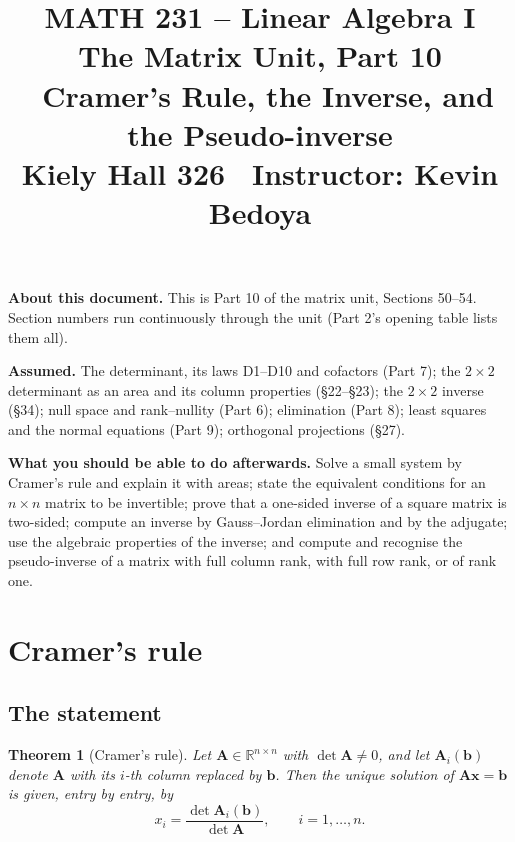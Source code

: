 \documentclass[11pt]{article}
\title{\vspace{-1.2cm}\textbf{\sffamily MATH 231 -- Linear Algebra I}\\[4pt]
       {\large\sffamily The Matrix Unit, Part 10 \textbullet\ Cramer's Rule,
        the Inverse, and the Pseudo-inverse}\\[2pt]
       {\normalsize\sffamily Kiely Hall 326 \textbullet\
        Instructor: Kevin Bedoya}}
\author{}
\date{}
\theoremstyle{plain}
\newtheorem{thm}{Theorem}[section]
\theoremstyle{definition}
\theoremstyle{remark}
\newcommand{\R}{\mathbb{R}}
\newcommand{\vc}[1]{\mathbf{#1}}
\newcommand{\mt}[1]{\mathbf{#1}}
\begin{document}
\setcounter{section}{49}  %
\maketitle
\vspace{-1.6cm}

\noindent\textbf{About this document.} This is Part 10 of the matrix unit,
Sections 50--54. Section numbers run continuously through the unit (Part 2's
opening table lists them all).

\medskip
\noindent\textbf{Assumed.} The determinant, its laws D1--D10 and cofactors
(Part 7); the $2\times2$ determinant as an area and its column properties
(\S22--\S23); the $2\times2$ inverse (\S34); null space and rank--nullity (Part
6); elimination (Part 8); least squares and the normal equations (Part 9);
orthogonal projections (\S27).

\medskip
\noindent\textbf{What you should be able to do afterwards.} Solve a small system by
Cramer's rule and explain it with areas; state the equivalent conditions for an
$n\times n$ matrix to be invertible; prove that a one-sided inverse of a square
matrix is two-sided; compute an inverse by Gauss--Jordan elimination and by the
adjugate; use the algebraic properties of the inverse; and compute and recognise
the pseudo-inverse of a matrix with full column rank, with full row rank, or of
rank one.

\section{Cramer's rule}

\subsection{The statement}
\begin{thm}[Cramer's rule]
\label{thm:cramer}
Let $\mt{A}\in\R^{n\times n}$ with $\det\mt{A}\neq0$, and let $\mt{A}_i(\vc{b})$
denote $\mt{A}$ with its $i$-th column replaced by $\vc{b}$. Then the unique
solution of $\mt{A}\vc{x}=\vc{b}$ is given, entry by entry, by
\[
  \boxed{\;x_i=\frac{\det\mt{A}_i(\vc{b})}{\det\mt{A}},\qquad i=1,\dots,n.\;}
\]
\end{thm}
\end{document}
